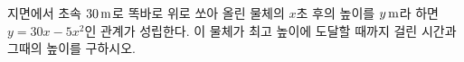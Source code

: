 지면에서 초속 $30\mkern3mu \mathrm{m}$로 똑바로 위로 쏘아 올린 물체의 $x$초 후의 높이를 $y\mkern3mu \mathrm{m}$라 하면 $y=30x-5x^2$인 관계가 성립한다. 이 물체가 최고 높이에 도달할 때까지 걸린 시간과 그때의 높이를 구하시오.
